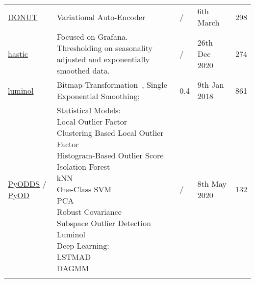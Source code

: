 \begin{table}[h]
{\begin{tabular}{lllll}
            \href{https://github.com/NetManAIOps/donut}{DONUT}                                                      & Variational Auto-Encoder~\cite{Xu.2018}                                                                                                                                                                                                                                                                                                                                                                                       & /         & 6th March         & 298   \\\addlinespace 
            \href{https://github.com/hastic}{hastic}                                                                & \makecell[l]{Focused on Grafana.\\Thresholding on seasonality adjusted and exponentially smoothed data.}                                                                                                                                                                                                                                                                                                                      & /         & 26th Dec 2020     & 274   \\\addlinespace 
            \href{https://github.com/linkedin/luminol}{luminol}                                                     & Bitmap-Transformation~\cite{Wei.2005}, Single Exponential Smoothing;                                                                                                                                                                                                                                                                                                                                                          & 0.4       & 9th Jan 2018      & 861   \\\addlinespace 
            \href{https://github.com/datamllab/pyodds}{PyODDS} / \href{https://github.com/yzhao062/pyod}{PyOD}      & \makecell[l]{Statistical Models:\\\tabitem{} Local Outlier Factor\\\tabitem{} Clustering Based Local Outlier Factor\\\tabitem{} Histogram-Based Outlier Score\\\tabitem{} Isolation Forest\\\tabitem{} kNN\\\tabitem{} One-Class SVM\\\tabitem{} PCA\\\tabitem{} Robust Covariance\\\tabitem{} Subspace Outlier Detection\\\tabitem{} Luminol\\ Deep Learning:\\\tabitem{} LSTMAD\cite{Malhotra.2015}\\\tabitem{} DAGMM~\cite{Zong.2018}}             & /         & 8th May 2020      & 132   \\\addlinespace 

\end{tabular}}
\end{table}
